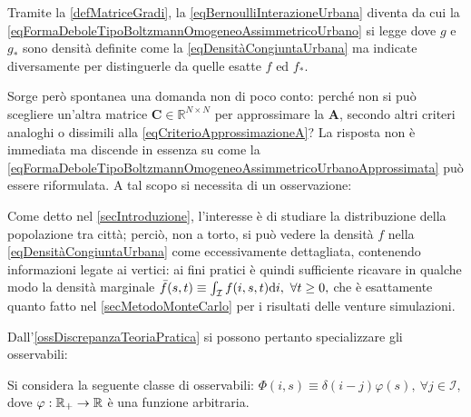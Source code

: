             Tramite la \cref{defMatriceGradi}, la \ref{eqBernoulliInterazioneUrbana} diventa
            da cui la \ref{eqFormaDeboleTipoBoltzmannOmogeneoAssimmetricoUrbano} si legge
            dove \(g\) e \(g_*\) sono densità definite come la \cref{eqDensitàCongiuntaUrbana} ma indicate diversamente per distinguerle da quelle esatte \(f\) ed \(f_*\).

            Sorge però spontanea una domanda non di poco conto: perché non si può scegliere un'altra matrice \(\mathbf C\in\mathbb R^{N\times N}\) per approssimare la \(\mathbf A\), secondo altri criteri analoghi o dissimili alla \cref{eqCriterioApprossimazioneA}? La risposta non è immediata ma discende in essenza su come la \ref{eqFormaDeboleTipoBoltzmannOmogeneoAssimmetricoUrbanoApprossimata} può essere riformulata. A tal scopo si necessita di un osservazione:

            \begin{oss}
                \label{ossDiscrepanzaTeoriaPratica}
                Come detto nel \cref{secIntroduzione}, l'interesse è di studiare la distribuzione della popolazione tra città; perciò, non a torto, si può vedere la densità \(f\) nella \cref{eqDensitàCongiuntaUrbana} come eccessivamente dettagliata, contenendo informazioni legate ai vertici: ai fini pratici è quindi sufficiente ricavare in qualche modo la densità marginale 
                \( 
                    \bar f(s,t)\equiv\int_{\mathcal I}f(i,s,t)\mathrm{d} i,\ \forall t\geq0,
                \) 
                che è esattamente quanto fatto nel \cref{secMetodoMonteCarlo} per i risultati delle venture simulazioni.
            \end{oss}

            Dall'\cref{ossDiscrepanzaTeoriaPratica} si possono pertanto specializzare gli osservabili:
          
            \begin{ipo}
                \label{ipOsservabileUrbanoNodale}
                Si considera la seguente classe di osservabili: 
                \(
                    \Phi(i,s)\equiv\delta(i-j)\varphi(s),\ \forall j\in\mathcal I,
                \) 
                dove \(\varphi:\mathbb R_+\to\mathbb R\) è una funzione arbitraria.
            \end{ipo}
           
